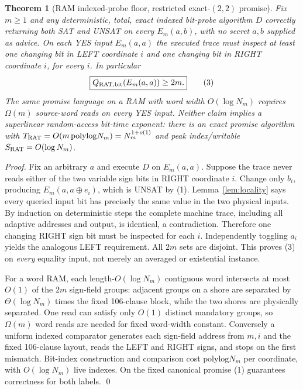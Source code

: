 \documentclass[11pt]{article}
\newtheorem{theorem}{Theorem}
\begin{document}
\begin{theorem}[RAM indexed-probe floor, restricted exact-$(2,2)$ promise]
\label{th:yes}
Fix $m\ge1$ and \emph{any} deterministic, total, exact indexed
bit-probe algorithm $D$ correctly returning both SAT and UNSAT on
\emph{every} $E_m(a,b)$, with no secret $a,b$ supplied as advice.
On each YES input $E_m(a,a)$ the executed trace must inspect
at least one changing bit in LEFT coordinate $i$ and one changing
bit in RIGHT coordinate $i$, for \emph{every} $i$. In particular
\begin{equation}
\boxed{Q_{\rm RAT,bit}(E_m(a,a))\ge2m.} \tag{3}
\end{equation}
The same promise language on a RAM with word width
$O(\log N_m)$ requires $\Omega(m)$ source-word reads on every YES
input. Neither claim implies a superlinear random-access bit-time
exponent: there is an exact promise algorithm with
$T_{\rm RAT}=O(m\,\mathrm{polylog}N_m)=N_m^{1+o(1)}$
and peak index/writable $S_{\rm RAT}=O(\log N_m)$.
\end{theorem}
\begin{proof}
Fix an arbitrary $a$ and execute $D$ on $E_m(a,a)$.
Suppose the trace never reads either of the two variable sign bits in
RIGHT coordinate $i$. Change only $b_i$, producing
$E_m(a,a\oplus e_i)$, which is UNSAT by (1).
Lemma~\ref{lem:locality} says every queried input bit has precisely
the same value in the two physical inputs. By induction on deterministic
steps the complete machine trace, including all adaptive addresses and
output, is identical, a contradiction. Therefore one changing RIGHT
sign bit must be inspected for each $i$. Independently toggling
$a_i$ yields the analogous LEFT requirement. All $2m$ sets are
disjoint. This proves (3) on \emph{every} equality input, not merely
an averaged or existential instance.

For a word RAM, each length-$O(\log N_m)$ contiguous word intersects
at most $O(1)$ of the $2m$ sign-field groups: adjacent groups on a
shore are separated by $\Theta(\log N_m)$ times the fixed 106-clause
block, while the two shores are physically separated.
One read can satisfy only $O(1)$ distinct mandatory groups,
so $\Omega(m)$ word reads are needed for fixed word-width constant.
Conversely a uniform indexed comparator generates each sign-field
address from $m,i$ and the fixed 106-clause layout, reads the LEFT and
RIGHT signs, and stops on the first mismatch. Bit-index construction
and comparison cost $\mathrm{polylog}N_m$ per coordinate, with
$O(\log N_m)$ live indexes. On the fixed canonical promise (1)
guarantees correctness for both labels. \qed
\end{proof}
\end{document}

